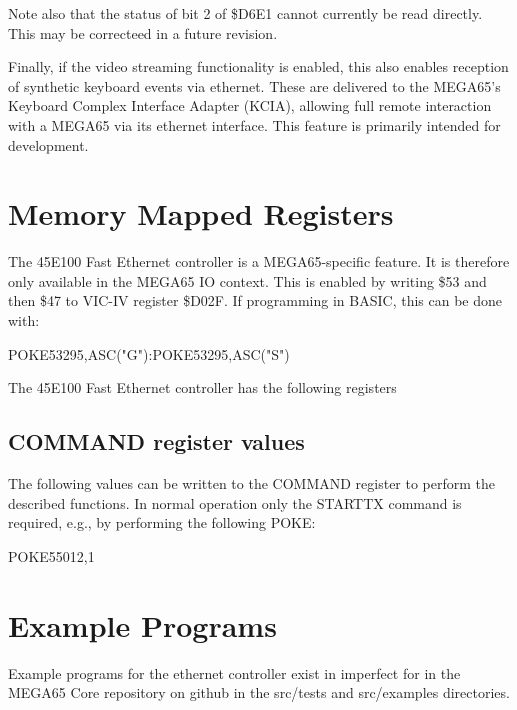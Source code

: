 Note also that
the status of bit 2 of \$D6E1 cannot currently be read directly. This may be correcteed in a future
revision.

Finally, if the video streaming functionality is enabled, this also enables reception of synthetic
keyboard events via ethernet.  These are delivered to the MEGA65's Keyboard Complex Interface Adapter
(KCIA), allowing full remote interaction with a MEGA65 via its ethernet interface.  This feature is
primarily intended for development.

\section{Memory Mapped Registers}

The 45E100 Fast Ethernet controller is a MEGA65-specific feature.
It is therefore only available in the MEGA65 IO context.
This is enabled by writing \$53 and then \$47 to VIC-IV register \$D02F.
If programming in BASIC, this can be done with:

\begin{screenoutput}
POKE53295,ASC("G"):POKE53295,ASC("S")
\end{screenoutput}

The 45E100 Fast Ethernet controller has the following registers



\subsection{COMMAND register values}

The following values can be written to the COMMAND register to perform the described functions.
In normal operation only the STARTTX command is required, e.g., by performing the following POKE:

\begin{screenoutput}
POKE55012,1
\end{screenoutput}



\section{Example Programs}

Example programs for the ethernet controller exist in imperfect for in the MEGA65 Core repository on github in the src/tests and src/examples directories.
